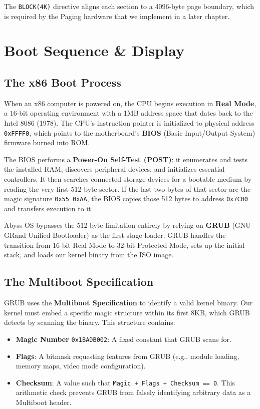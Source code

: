 \documentclass[12pt,a4paper]{report}
\begin{document}
The \texttt{BLOCK(4K)} directive aligns each section to a 4096-byte page boundary,
which is required by the Paging hardware that we implement in a later chapter.

\newpage

\chapter{Boot Sequence \& Display}

\section{The x86 Boot Process}

When an x86 computer is powered on, the CPU begins execution in \textbf{Real Mode},
a 16-bit operating environment with a 1MB address space that dates back to the Intel
8086 (1978). The CPU's instruction pointer is initialized to physical address
\texttt{0xFFFF0}, which points to the motherboard's \textbf{BIOS} (Basic Input/Output
System) firmware burned into ROM.

The BIOS performs a \textbf{Power-On Self-Test (POST)}: it enumerates and tests the
installed RAM, discovers peripheral devices, and initializes essential controllers.
It then searches connected storage devices for a bootable medium by reading the very
first 512-byte sector. If the last two bytes of that sector are the magic signature
\texttt{0x55 0xAA}, the BIOS copies those 512 bytes to address \texttt{0x7C00} and
transfers execution to it.

Abyss OS bypasses the 512-byte limitation entirely by relying on \textbf{GRUB} (GNU
GRand Unified Bootloader) as the first-stage loader. GRUB handles the transition
from 16-bit Real Mode to 32-bit Protected Mode, sets up the initial stack, and loads
our kernel binary from the ISO image.

\section{The Multiboot Specification}

GRUB uses the \textbf{Multiboot Specification} to identify a valid kernel binary.
Our kernel must embed a specific magic structure within its first 8KB, which GRUB
detects by scanning the binary. This structure contains:

\begin{itemize}
    \item \textbf{Magic Number} \texttt{0x1BADB002}: A fixed constant that GRUB scans for.
    \item \textbf{Flags}: A bitmask requesting features from GRUB (e.g., module loading,
    memory maps, video mode configuration).
    \item \textbf{Checksum}: A value such that \texttt{Magic + Flags + Checksum == 0}.
    This arithmetic check prevents GRUB from falsely identifying arbitrary data as a
    Multiboot header.
\end{itemize}
\end{document}
